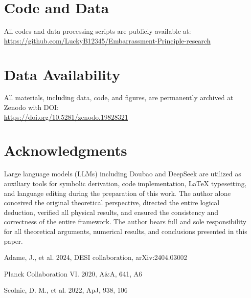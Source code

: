 \documentclass[10pt,twocolumn]{article}
\begin{document}
\section{Code and Data}
All codes and data processing scripts are publicly available at:\\
\url{https://github.com/LuckyB12345/Embarrassment-Principle-research}

\section{Data Availability}
All materials, including data, code, and figures, are permanently archived
at Zenodo with DOI:\\
\url{https://doi.org/10.5281/zenodo.19828321}

\section*{Acknowledgments}
Large language models (LLMs) including Doubao and DeepSeek are utilized as auxiliary tools for symbolic derivation, code implementation, LaTeX typesetting, and language editing during the preparation of this work. The author alone conceived the original theoretical perspective, directed the entire logical deduction, verified all physical results, and ensured the consistency and correctness of the entire framework. The author bears full and sole responsibility for all theoretical arguments, numerical results, and conclusions presented in this paper.

\begin{thebibliography}{}
Adame, J., et al. 2024, DESI collaboration, arXiv:2404.03002

Planck Collaboration VI. 2020, A\&A, 641, A6

Scolnic, D. M., et al. 2022, ApJ, 938, 106
\end{thebibliography}
\end{document}
